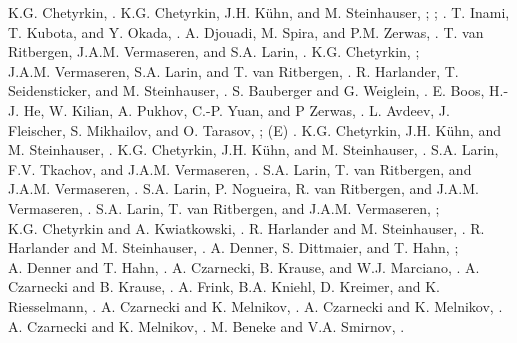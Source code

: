   K.G. Chetyrkin, .
  K.G. Chetyrkin, J.H. K\"uhn, and M. Steinhauser, ;
  ; .
  T. Inami, T. Kubota, and Y. Okada, .
  A. Djouadi, M. Spira, and P.M. Zerwas, .
  T. van Ritbergen, J.A.M. Vermaseren, and S.A. Larin,
  .
 K.G. Chetyrkin, ;\\
  J.A.M. Vermaseren, S.A. Larin, and T. van Ritbergen, .
  R. Harlander, T. Seidensticker, and M. Steinhauser, .
  S. Bauberger and G. Weiglein, .
  E. Boos, H.-J. He, W. Kilian, A. Pukhov, C.-P. Yuan, and P Zerwas, 
  .
  L. Avdeev, J. Fleischer, S. Mikhailov, and O. Tarasov,
  ; (E) .
  K.G. Chetyrkin, J.H. K\"uhn, and M. Steinhauser,
  .
  K.G. Chetyrkin, J.H. K\"uhn, and M. Steinhauser,
  .
  S.A. Larin, F.V. Tkachov, and J.A.M. Vermaseren, .
  S.A. Larin, T. van Ritbergen, and J.A.M. Vermaseren, .
  S.A. Larin, P. Nogueira, R. van Ritbergen, and J.A.M. Vermaseren,
  .
  S.A. Larin, T. van Ritbergen, and J.A.M. Vermaseren, ;\\
  K.G. Chetyrkin and A. Kwiatkowski, .
  R. Harlander and M. Steinhauser, .
  R. Harlander and M. Steinhauser, .
A. Denner, S. Dittmaier, and T. Hahn, ;\\
A. Denner and T. Hahn, .
  A. Czarnecki, B. Krause, and W.J. Marciano, .
  A. Czarnecki and B. Krause, .
  A. Frink, B.A. Kniehl, D. Kreimer, and K. Riesselmann,
  .
  A. Czarnecki and K. Melnikov, .
  A. Czarnecki and K. Melnikov, .
  A. Czarnecki and K. Melnikov, .
  M. Beneke and V.A. Smirnov, .
